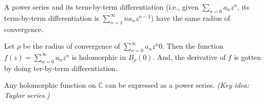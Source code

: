 
\begin{lem}
	A power series and its term-by-term differentiation (i.e., given $\sum_{n=0} a_nz^n$, its term-by-term differentiation is  $\sum_{n=1}^\infty na_nz^{n-1}$) have the same radius of convergence.
\end{lem}

\begin{thm}
	Let $\rho$ be the radius of convergence of $\sum_{n=0}^\infty a_nz^n0$. Then the function $f(z) = \sum_{n=0}^\infty a_nz^n$ is holomorphic in $B_\rho(0)$. And, the derivative of  $f$ is gotten by doing ter-by-term differentiation.
\end{thm}

\begin{thm}
	Any holomorphic function on $\mathbb{C}$ can be expressed as a power series. \emph{(Key idea: Taylor series.)}
\end{thm}
